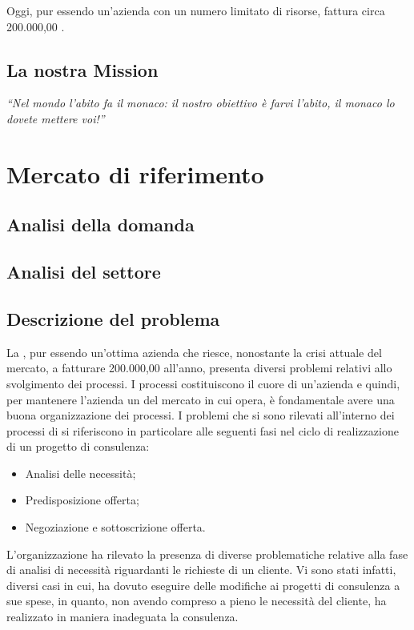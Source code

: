 Oggi, pur essendo un'azienda con un numero limitato di risorse, fattura circa  200.000,00 \text{\euro}.

\subsection{La nostra Mission}

\textit{``Nel mondo l'abito fa il monaco: il nostro obiettivo è farvi l'abito, il monaco lo dovete mettere voi!''}




\clearpage

\section{Mercato di riferimento} 
\subsection{Analisi della domanda}\label{sec:domanda}

\subsection{Analisi del settore}

\subsection{Descrizione del problema}
La \customer , pur essendo un'ottima azienda che riesce, nonostante la crisi attuale del mercato, a fatturare  200.000,00 \text{\euro} all'anno, presenta diversi problemi relativi allo svolgimento dei processi.
I processi costituiscono il cuore di un'azienda e quindi, per mantenere l'azienda un  del mercato in cui opera, è fondamentale avere una buona organizzazione dei processi.
I problemi che si sono rilevati all'interno dei processi di \customer si riferiscono in particolare alle seguenti fasi nel ciclo di realizzazione di un progetto di consulenza:
\begin{itemize}
	\item Analisi delle necessità;
	\item Predisposizione offerta;
	\item Negoziazione e sottoscrizione offerta.
\end{itemize}

L'organizzazione ha rilevato la presenza di diverse problematiche relative alla fase di analisi di necessità riguardanti le richieste di un cliente. Vi sono stati infatti, diversi casi in cui, \customer  ha dovuto eseguire delle modifiche ai progetti di consulenza a sue spese, in quanto, non avendo compreso a pieno le necessità del cliente, ha  realizzato in maniera inadeguata la consulenza. 

